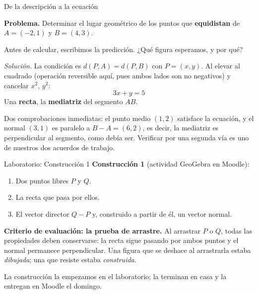 \documentclass[aspectratio=169,10pt]{beamer}
\newcommand{\destaca}[1]{%
  \par\vspace{3pt}\noindent
  \colorbox{turquesaClaro}{%
    \parbox{\dimexpr\linewidth-2\fboxsep\relax}{\vspace{3pt}#1\vspace{3pt}}}%
  \par\vspace{3pt}}
\begin{document}
\begin{frame}{De la descripción a la ecuación}
  \destaca{\textbf{Problema.} Determinar el lugar geométrico de los
  puntos que \textbf{equidistan} de $A=(-2,1)$ y $B=(4,3)$.}

  \vspace{0.2cm}
  Antes de calcular, escribimos la predicción. ¿Qué figura esperamos,
  y por qué?

  \vspace{0.2cm}

  {\small \textit{Solución.} La condición es $d(P,A)=d(P,B)$ con
  $P=(x,y)$. Al elevar al cuadrado (operación reversible aquí, pues
  ambos lados son no negativos) y cancelar $x^2$, $y^2$:
  \[
    \boxed{\,3x+y=5\,}
  \]
  Una \textbf{recta}, la \textbf{mediatriz} del segmento $AB$.}

  \vspace{0.2cm}
  \destaca{\small Dos comprobaciones inmediatas: el punto medio $(1,2)$
  satisface la ecuación, y el normal $(3,1)$ es paralelo a
  $B-A=(6,2)$, es decir, la mediatriz es perpendicular al segmento,
  como debía ser. Verificar por una segunda vía es uno de nuestros dos
  acuerdos de trabajo.}
\end{frame}
\begin{frame}{Laboratorio: Construcción 1}
  \textbf{Construcción 1} (actividad GeoGebra en Moodle):
  \begin{enumerate}
    \item Dos puntos libres $P$ y $Q$.
    \item La recta que pasa por ellos.
    \item El vector director $Q-P$ y, construido a partir de él,
      un vector normal.
  \end{enumerate}

  \vspace{0.4cm}
  \destaca{\textbf{Criterio de evaluación: la prueba de arrastre.}
  Al arrastrar $P$ o $Q$, todas las propiedades deben conservarse: la
  recta sigue pasando por ambos puntos y el normal permanece
  perpendicular. Una figura que se deshace al arrastrarla estaba
  \textit{dibujada}; una que resiste estaba \textit{construida}.}

  \vspace{0.3cm}
  {\footnotesize La construcción la empezamos en el laboratorio; la
  terminan en casa y la entregan en Moodle el domingo.}
\end{frame}
\end{document}

